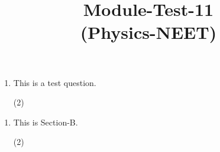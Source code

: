 \documentclass{article}
\title{Module-Test-11\\(Physics-NEET)}
\renewcommand{\ans}{\quad}
\begin{document}
\maketitle

\neetSectionA
\begin{enumerate}
\item This is a test question.
\begin{center}
\end{center}
\begin{tasks}(2)
\task \ans 
\task 
\end{tasks}

\end{enumerate}

\neetSectionB
\begin{enumerate}ddtocounter{enumi}{35}
\item This is Section-B.
\begin{tasks}(2)
\task \ans 
\task 
\end{tasks}

\end{enumerate}
\end{document}

